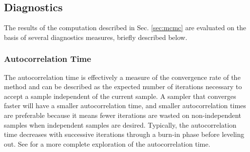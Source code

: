 \documentclass[preprint]{aastex}
\begin{document}
\clearpage
\subsection{Diagnostics}
\label{sec:diag}

The results of the computation described in Sec. \ref{sec:mcmc} are evaluated 
on the basis of several diagnostics measures, briefly described below.

\subsubsection{Autocorrelation Time}
\label{sec:acorr}

The autocorrelation time is effectively a measure of the convergence rate of 
the method and can be described as the expected number of iterations necessary 
to accept a sample independent of the current sample.  A sampler that converges 
faster will have a smaller autocorrelation time, and smaller autocorrelation 
times are preferable because it means fewer iterations are wasted on 
non-independent samples when independent samples are desired.  Typically, the 
autocorrelation time decreases with successive iterations through a burn-in 
phase before leveling out.  See \citet{Foreman-Mackey2013} for a more complete 
exploration of the autocorrelation time.
\end{document}
